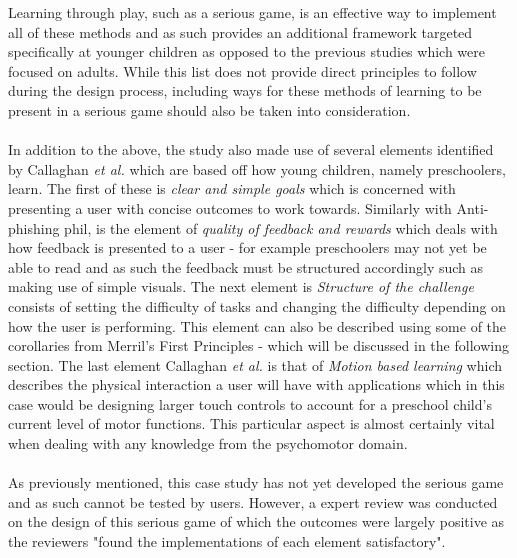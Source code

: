 \documentclass[conference]{IEEEtran}
\begin{document}
Learning through play, such as a serious game, is an effective way to implement all of these methods\cite{allers2021children} and as such provides an additional framework targeted specifically at younger children as opposed to the previous studies\cite{Dincelli2020,Sheng2007} which were focused on adults. While this list does not provide direct principles to follow during the design process, including ways for these methods of learning to be present in a serious game should also be taken into consideration.
\\\\
In addition to the above, the study also made use of several elements identified by Callaghan \textit{et al.}\cite{callaghan2018} which are based off how young children, namely preschoolers, learn. The first of these is \textit{clear and simple goals} which is concerned with presenting a user with concise outcomes to work towards\cite{callaghan2018}. Similarly with Anti-phishing phil\cite{Sheng2007}, is the element of \textit{quality of feedback and rewards} which deals with how feedback is presented to a user - for example preschoolers may not yet be able to read and as such the feedback must be structured accordingly such as making use of simple visuals\cite{allers2021children}. The next element is \textit{Structure of the challenge} consists of setting the difficulty of tasks and changing the difficulty depending on how the user is performing\cite{callaghan2018}. This element can also be described using some of the corollaries from Merril's First Principles\cite{Merrill2002} - which will be discussed in the following section. The last element Callaghan \textit{et al.}\cite{callaghan2018} is that of \textit{Motion based learning} which describes the physical interaction a user will have with applications which in this case would be designing larger touch controls to account for a preschool child's current level of motor functions. This particular aspect is almost certainly vital when dealing with any knowledge from the psychomotor domain.
\\\\
As previously mentioned, this case study has not yet developed the serious game and as such cannot be tested by users. However, a expert review was conducted on the design of this serious game of which the outcomes were largely positive as the reviewers "found the implementations of each element satisfactory"\cite{allers2021children}.
\end{document}
